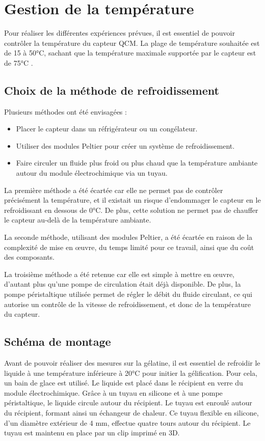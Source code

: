 \chapter{Gestion de la température}
\label{chap:Gestion de la température}
Pour réaliser les différentes expériences prévues, il est essentiel de pouvoir contrôler la température du capteur QCM.  
La plage de température souhaitée est de 15 à 50°C, sachant que la température maximale supportée par le capteur est de 75°C \cite{manual-openqcmQ1}.

\section{Choix de la méthode de refroidissement}

Plusieurs méthodes ont été envisagées :
\begin{itemize}[label=\textbullet]
    \item Placer le capteur dans un réfrigérateur ou un congélateur.
    \item Utiliser des modules Peltier pour créer un système de refroidissement.
    \item Faire circuler un fluide plus froid ou plus chaud que la température ambiante autour du module électrochimique via un tuyau.
\end{itemize}

La première méthode a été écartée car elle ne permet pas de contrôler précisément la température, et il existait un risque d’endommager le capteur en le refroidissant en dessous de 0°C. De plus, cette solution ne permet pas de chauffer le capteur au-delà de la température ambiante.

La seconde méthode, utilisant des modules Peltier, a été écartée en raison de la complexité de mise en œuvre, du temps limité pour ce travail, ainsi que du coût des composants.

La troisième méthode a été retenue car elle est simple à mettre en œuvre, d’autant plus qu’une pompe de circulation était déjà disponible. De plus, la pompe péristaltique utilisée permet de régler le débit du fluide circulant, ce qui autorise un contrôle de la vitesse de refroidissement, et donc de la température du capteur.

\section{Schéma de montage}

Avant de pouvoir réaliser des mesures sur la gélatine, il est essentiel de refroidir le liquide à une température inférieure à 20°C pour initier la gélification.  
Pour cela, un bain de glace est utilisé. Le liquide est placé dans le récipient en verre du module électrochimique.  
Grâce à un tuyau en silicone et à une pompe péristaltique, le liquide circule autour du récipient.  
Le tuyau est enroulé autour du récipient, formant ainsi un échangeur de chaleur.  
Ce tuyau flexible en silicone, d’un diamètre extérieur de 4 mm, effectue quatre tours autour du récipient.  
Le tuyau est maintenu en place par un clip imprimé en 3D.

